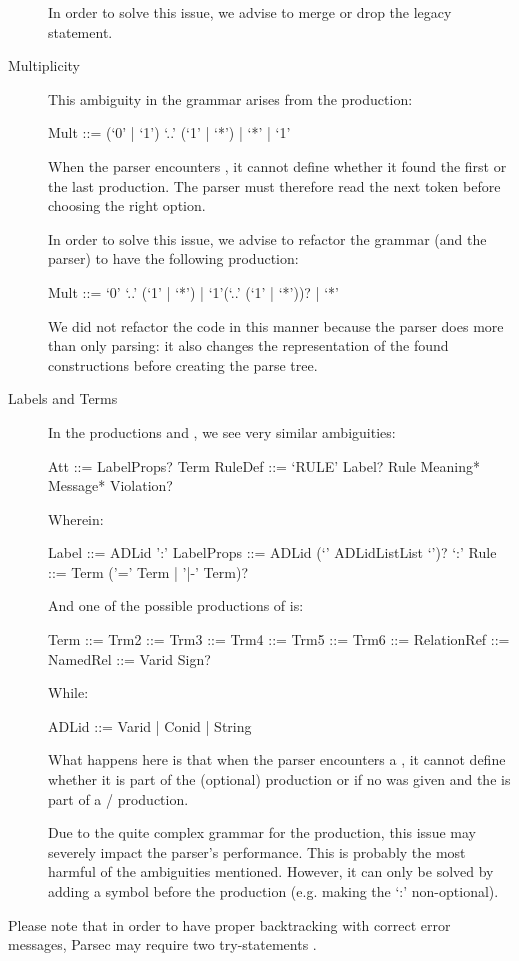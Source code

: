 \begin{description}
    In order to solve this issue, we advise to merge or drop the legacy statement.
    
  \item[Multiplicity]
    This ambiguity in the grammar arises from the  production:
    \begin{ebnf}
     Mult ::= (`0' | `1') `..' (`1' | `*') | `*' | `1'\end{ebnf}
    When the parser encounters , it cannot define whether it found the first or the last production.
    The parser must therefore read the next token before choosing the right option.
    
    In order to solve this issue, we advise to refactor the grammar (and the parser) to have the following production:
    \begin{ebnf}
     Mult ::= `0' `..' (`1' | `*') | `1'(`..' (`1' | `*'))? | `*'\end{ebnf}
    We did not refactor the code in this manner because the  parser does more than only parsing: it also changes the representation of the found constructions before creating the parse tree.
  
  \item[Labels and Terms]
    In the productions  and , we see very similar ambiguities:
    \begin{ebnf}
     Att ::= LabelProps? Term
     RuleDef ::= `RULE' Label? Rule Meaning* Message* Violation?\end{ebnf}
    Wherein:
    \begin{ebnf}
     Label ::= ADLid ':'
     LabelProps ::= ADLid (`{' ADLidListList `}')? `:'
     Rule ::= Term ('=' Term | '|-' Term)?\end{ebnf}
    And one of the possible productions of  is:
    \begin{ebnf}
     Term ::= Trm2 ::= Trm3 ::= Trm4 ::= Trm5 ::= Trm6 ::= RelationRef ::= NamedRel ::= Varid Sign?\end{ebnf}
    While:
    \begin{ebnf}
     ADLid ::= Varid | Conid | String\end{ebnf}
    
    What happens here is that when the parser encounters a , it cannot define whether it is part of the (optional)  production or if no  was given and the  is part of a / production.
    
    Due to the quite complex grammar for the  production, this issue may severely impact the parser's performance.
    This is probably the most harmful of the ambiguities mentioned.
    However, it can only be solved by adding a symbol before the  production (e.g. making the `:' non-optional).
\end{description}
%
Please note that in order to have proper backtracking with correct error messages, Parsec may require two try-statements .

